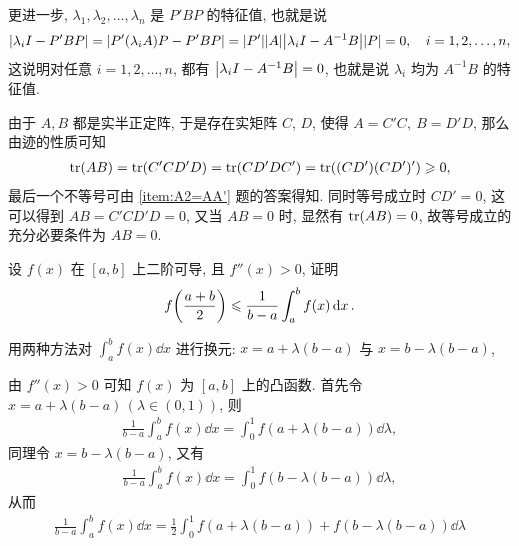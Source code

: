 \begin{exercise}[series=exer]
\begin{answer}
\begin{answersheet}
            更进一步, $ \lambda_{1}, \lambda_{2}, \dots, \lambda_{n} $ 是 $ P'BP $ 的特征值, 也就是说
            \begin{align*}
                \abs{\lambda_{i}I - P'BP} = \abs{P'(\lambda_{i}A)P - P'BP} = \abs{P'}\abs{A}\abs{\lambda_{i} I - A^{-1}B}\abs{P} = 0, \quad i = 1, 2, \dots, n,
            \end{align*}
            这说明对任意 $ i = 1, 2, \dots, n $, 都有 $ \abs{\lambda_{i} I - A^{-1}B} = 0 $, 也就是说 $ \lambda_{i} $ 均为 $ A^{-1}B $ 的特征值. 
            \item 由于 $ A, B $ 都是实半正定阵, 于是存在实矩阵 $ C $, $ D $, 使得 $ A = C'C,\ B = D'D $, 那么由迹的性质可知
            \begin{align*}
                \tr(AB) = \tr(C'CD'D) = \tr(CD'DC') = \tr((CD')(CD')') \geqslant 0,
            \end{align*}
            最后一个不等号可由 \ref{item:A2=AA'} 题的答案得知. 同时等号成立时 $ CD' = 0 $, 这可以得到 $ AB = C'CD'D = 0 $, 又当 $ AB = 0 $ 时, 显然有 $ \tr(AB) = 0 $, 故等号成立的充分必要条件为 $ AB = 0 $.
        \end{answersheet}
    \end{answer}
    \item 设 $ f(x) $ 在 $ [a, b] $ 上二阶可导, 且 $ f''(x) > 0 $, 证明
    \begin{align*}
        f\qty(\frac{a + b}{2}) \leqslant \frac{1}{b - a} \int_{a}^{b} f(x) \dd{x}.
    \end{align*}
    \begin{hint}
        用两种方法对 $ \int_{a}^{b} f(x) \dd{x} $ 进行换元: $ x = a + \lambda(b - a) $ 与 $ x = b - \lambda(b - a) $, 
    \end{hint}
    \begin{answer}
        由 $ f''(x) > 0 $ 可知 $ f(x) $ 为 $ [a, b] $ 上的凸函数. 首先令 $ x = a + \lambda(b - a)\,(\lambda \in (0, 1)) $, 则
        \begin{align*}
            \frac{1}{b - a}\int_{a}^{b} f(x) \dd{x} = \int_{0}^{1} f(a + \lambda(b - a)) \dd{\lambda},
        \end{align*}
        同理令 $ x = b - \lambda(b - a) $, 又有
        \begin{align*}
            \frac{1}{b - a}\int_{a}^{b} f(x) \dd{x} = \int_{0}^{1} f(b - \lambda(b - a)) \dd{\lambda},
        \end{align*}
        从而
        \begin{align*}
            \frac{1}{b - a}\int_{a}^{b} f(x) \dd{x} = \frac{1}{2} \int_{0}^{1} f(a + \lambda(b - a)) + f(b - \lambda(b - a)) \dd{\lambda}

\end{align*}
\end{answer}
\end{exercise}
